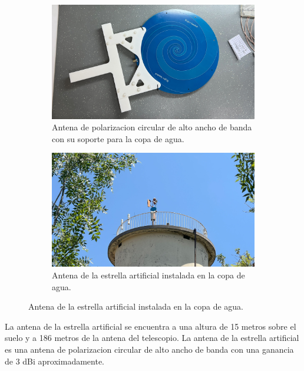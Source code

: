 \begin{figure}[h!]
    \centering
    \begin{subfigure}{0.45\textwidth}
        \includegraphics[width=\textwidth]{img/paleta}
        \caption{Antena de polarizacion circular de alto ancho de banda con su soporte para la copa de agua.}
        \label{fig:antena_estrella}
    \end{subfigure}
    \begin{subfigure}{0.45\textwidth}
        \includegraphics[width=\textwidth]{img/fake_star}
        \caption{Antena de la estrella artificial instalada en la copa de agua.}
        \label{fig:antena_estrella2}
    \end{subfigure}
\end{figure}

La antena de la estrella artificial se encuentra a una altura de 15 metros sobre el suelo y a 186 metros de la antena del telescopio. La antena de la estrella artificial es una antena de polarizacion circular de alto ancho de banda con una ganancia de 3 dBi aproximadamente.\\

